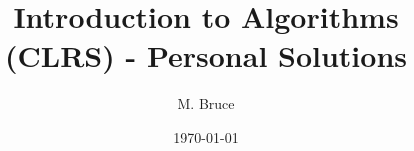 \documentclass[a4paper,12pt]{book}
\begin{document}
\author{M. Bruce}
\title{Introduction to Algorithms (CLRS) - Personal Solutions}
\date{\today}

\frontmatter
\maketitle
\tableofcontents

\mainmatter





\backmatter
\end{document}
